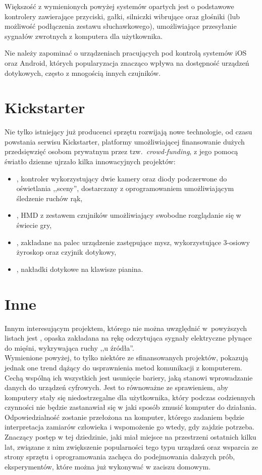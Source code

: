 Większość z wymienionych powyżej systemów opartych jest o podstawowe kontrolery zawierające przyciski, gałki, silniczki wibrujące oraz głośniki (lub możliwość podłączenia zestawu słuchawkowego), umożliwiające przesyłanie sygnałów zwrotnych z komputera dla użytkownika.

Nie należy zapominać o urządzeniach pracujących pod kontrolą systemów iOS oraz Android, których popularyzacja znacząco wpływa na dostępność urządzeń dotykowych, często z mnogością innych czujników.\\

\section{Kickstarter}

Nie tylko istniejący już producenci sprzętu rozwijają nowe technologie, od czasu powstania serwisu Kickstarter, platformy umożliwiającej finansowanie dużych przedsięwzięć osobom prywatnym przez tzw.\ \textit{crowd-funding}, z jego pomocą światło dzienne ujrzało kilka innowacyjnych projektów:
\begin{itemize}
 \item {}, kontroler wykorzystujący dwie kamery oraz diody podczerwone do oświetlania ,,sceny'', dostarczany z oprogramowaniem umożliwiającym śledzenie ruchów rąk,
 \item {}, HMD z zestawem czujników umożliwiający swobodne rozglądanie się w świecie gry,
 \item {}, zakładane na palec urządzenie zastępujące mysz, wykorzystujące 3-osiowy żyroskop oraz czyjnik dotykowy,
 \item {}, nakładki dotykowe na klawisze pianina.\\
\end{itemize}

\section{Inne}

Innym interesującym projektem, którego nie można uwzględnić w~powyższych listach jest , opaska zakładana na rękę odczytująca sygnały elektryczne płynące do mięśni, wykrywająca ruchy ,,u źródła''.\\

Wymienione powyżej, to tylko niektóre ze sfinansowanych projektów, pokazują jednak one trend dążący do usprawnienia metod komunikacji z komputerem. Cechą wspólną ich wszystkich jest usunięcie bariery, jaką stanowi wprowadzanie danych do urządzeń cyfrowych. Jest to równoważne ze sprawieniem, aby komputery stały się niedostrzegalne dla użytkownika, który podczas codziennych czynności nie będzie zastanawiał się w jaki sposób zmusić komputer do działania. Odpowiedzialność zostanie przełożona na komputer, którego zadaniem będzie interpretacja zamiarów człowieka i wspomożenie go wtedy, gdy zajdzie potrzeba.\\

Znaczący postęp w tej dziedzinie, jaki miał miejsce na przestrzeni ostatnich kilku lat, związane z nim zwiększenie popularności tego typu urządzeń oraz wsparcia ze strony sprzętu i oprogramowania zachęca do podejmowania dalszych prób, eksperymentów, które można już wykonywać w zaciszu domowym.
